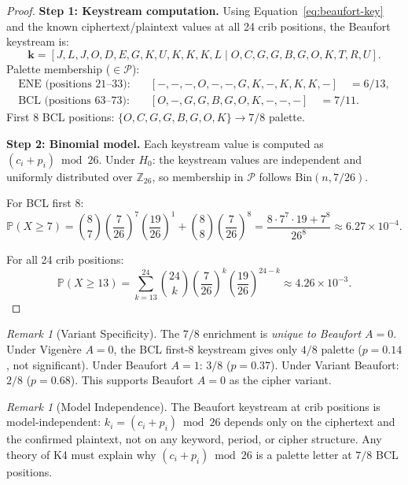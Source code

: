 \documentclass[11pt]{article}
\theoremstyle{plain}
\theoremstyle{definition}
\theoremstyle{remark}
\newtheorem{remark}[theorem]{Remark}
\newcommand{\Prob}{\mathbb{P}}
\newcommand{\Bin}{\mathrm{Bin}}
\newcommand{\palette}{\mathcal{P}}
\begin{document}
\begin{proof}
\textbf{Step 1: Keystream computation.} Using Equation~\eqref{eq:beaufort-key} and the known ciphertext/plaintext values at all 24 crib positions, the Beaufort keystream is:
\[
\mathbf{k} = [J, L, J, O, D, E, G, K, U, K, K, K, L \mid O, C, G, G, B, G, O, K, T, R, U].
\]
Palette membership ($\in \palette$):
\begin{align*}
\text{ENE (positions 21--33):} \quad & [-, -, -, O, -, -, G, K, -, K, K, K, -] \quad = 6/13, \\
\text{BCL (positions 63--73):} \quad & [O, -, G, G, B, G, O, K, -, -, -] \quad = 7/11.
\end{align*}
First 8 BCL positions: $\{O, C, G, G, B, G, O, K\} \to 7/8$ palette.

\textbf{Step 2: Binomial model.} Each keystream value is computed as $(c_i + p_i) \bmod 26$. Under $H_0$: the keystream values are independent and uniformly distributed over $\mathbb{Z}_{26}$, so membership in $\palette$ follows $\Bin(n, 7/26)$.

For BCL first 8:
\begin{equation}
\Prob(X \geq 7) = \binom{8}{7}\left(\frac{7}{26}\right)^7\left(\frac{19}{26}\right)^1 + \binom{8}{8}\left(\frac{7}{26}\right)^8 = \frac{8 \cdot 7^7 \cdot 19 + 7^8}{26^8} \approx 6.27 \times 10^{-4}.
\label{eq:bcl-p}
\end{equation}

For all 24 crib positions:
\begin{equation}
\Prob(X \geq 13) = \sum_{k=13}^{24}\binom{24}{k}\left(\frac{7}{26}\right)^k\left(\frac{19}{26}\right)^{24-k} \approx 4.26 \times 10^{-3}.
\label{eq:all-p}
\end{equation}
\end{proof}

\begin{remark}[Variant Specificity]
\label{rem:variant}
The $7/8$ enrichment is \emph{unique to Beaufort $A{=}0$}. Under Vigen\`{e}re $A{=}0$, the BCL first-8 keystream gives only $4/8$ palette ($p = 0.14$, not significant). Under Beaufort $A{=}1$: $3/8$ ($p = 0.37$). Under Variant Beaufort: $2/8$ ($p = 0.68$). This supports Beaufort $A{=}0$ as the cipher variant.
\end{remark}

\begin{remark}[Model Independence]
\label{rem:model-indep}
The Beaufort keystream at crib positions is model-independent: $k_i = (c_i + p_i) \bmod 26$ depends only on the ciphertext and the confirmed plaintext, not on any keyword, period, or cipher structure. Any theory of K4 must explain why $(c_i + p_i) \bmod 26$ is a palette letter at $7/8$ BCL positions.
\end{remark}
\end{document}
